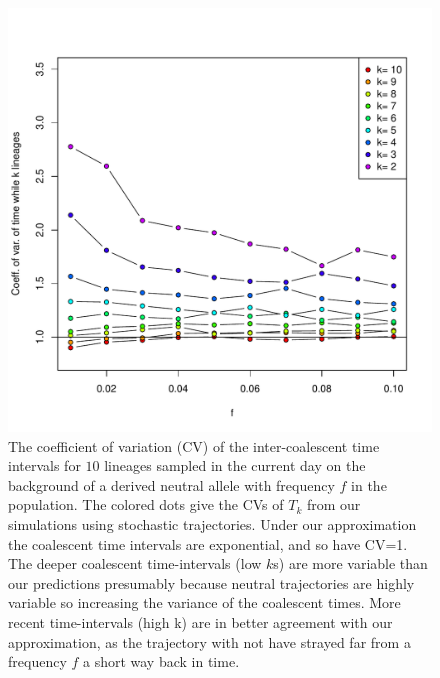 \documentclass[a4paper,10pt]{article}
\begin{document}
\begin{figure}
	\includegraphics[width = \textwidth]{../Paper_Figures/coeff_var_coal_times.pdf} 
\caption{The coefficient of variation (CV) of the inter-coalescent time intervals for $10$ lineages sampled in the current day on the background of a derived neutral allele with frequency $f$ in the population. The colored dots give the CVs of $T_k$ from our simulations using stochastic trajectories. Under our approximation the coalescent time intervals are exponential, and so have CV=1. The deeper coalescent time-intervals (low $k$s) are more variable than our predictions presumably because neutral trajectories are highly variable so increasing the variance of the coalescent times. More recent time-intervals (high k) are in better agreement with our approximation, as the trajectory with not have strayed far from a frequency $f$ a short way back in time. }
\label{coeff_var_coal_times_supp_plot}
\end{figure} %
\end{document}
